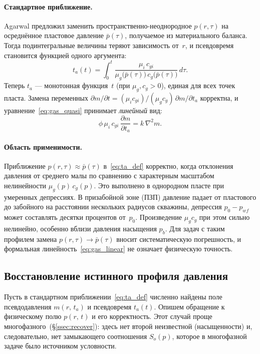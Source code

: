 ﻿\documentclass[12pt,a4paper]{article}
\begin{document}
\paragraph{Стандартное приближение.}
Agarwal предложил заменить пространственно-неоднородное
$p(r,\tau)$ на осреднённое пластовое давление $\bar{p}(\tau)$,
получаемое из материального баланса. Тогда подинтегральные
величины теряют зависимость от~$r$, и псевдовремя
становится функцией одного аргумента:
\begin{equation}\label{eq:ta_def}
  \boxed{t_a(t) = \int_0^t
    \frac{\mu_i\,c_{gi}}{\mu_g\bigl(\bar{p}(\tau)\bigr)\,
          c_g\bigl(\bar{p}(\tau)\bigr)}\,d\tau.}
\end{equation}
Теперь $t_a$ --- монотонная функция~$t$ (при $\mu_g,c_g > 0$),
единая для всех точек пласта. Замена переменных
$\partial m/\partial t = (\mu_i c_{gi})/(\mu_g c_g)\,
\partial m/\partial t_a$ корректна, и
уравнение~\eqref{eq:gas_quasi} принимает \emph{линейный} вид:
\begin{equation}\label{eq:gas_linear}
  \boxed{\phi\,\mu_i\,c_{gi}\,\frac{\partial m}{\partial t_a}
  = k\,\nabla^2 m.}
\end{equation}

\paragraph{Область применимости.}
Приближение $p(r,\tau) \approx \bar{p}(\tau)$ в~\eqref{eq:ta_def}
корректно, когда отклонения давления от среднего малы по сравнению
с характерным масштабом нелинейности $\mu_g(p)\,c_g(p)$.
Это выполнено в однородном пласте при умеренных депрессиях.
В призабойной зоне (ПЗП) давление падает от пластового до забойного
на расстоянии нескольких радиусов скважины, депрессия
$p_0 - p_{wf}$ может составлять десятки процентов от~$p_0$.
Произведение $\mu_g c_g$ при этом сильно нелинейно, особенно вблизи
давления насыщения $p_b$. Для задач с таким профилем замена
$p(r,\tau) \to \bar{p}(\tau)$ вносит систематическую погрешность,
и формальная линейность~\eqref{eq:gas_linear} не означает
физическую точность.

\subsection{Восстановление истинного профиля давления}\label{ssec:recover_single}

Пусть в стандартном приближении~\eqref{eq:ta_def} численно найдены
поле псевдодавления $m(r,\,t_a)$ и псевдовремя $t_a(t)$.
Опишем обращение к физическому полю $p(r,\,t)$ и его корректность.
Этот случай проще многофазного~(\S\ref{ssec:recover}): здесь нет
второй неизвестной (насыщенности) и, следовательно, нет
замыкающего соотношения $S_o(p)$, которое в многофазной задаче
было источником условности.
\end{document}
